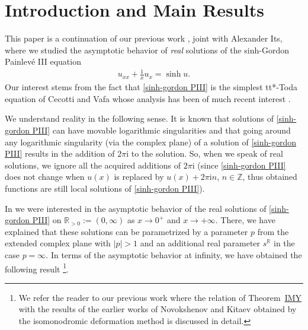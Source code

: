 \documentclass[a4paper,10pt,leqno]{amsart}
\numberwithin{equation}{subsection}
\theoremstyle{plain}
\theoremstyle{definition}
\theoremstyle{remark}
\theoremstyle{case}
\newcommand{\R}{\mathbb R}
\newcommand{\Z}{\mathbb Z}
\newcommand{\ii}{\mathrm{i}}
\begin{document}
\section{Introduction and Main Results}


This paper is a continuation of our previous work \cite{IMY}, joint with Alexander Its, where we studied the asymptotic behavior of {\it real} solutions of the sinh-Gordon Painlev\'e III equation
\begin{align}
    u_{xx} + \frac{1}{x} u_x = \sinh u.
    \label{sinh-gordon PIII}
\end{align}
Our interest stems from the fact that \eqref{sinh-gordon PIII} is the simplest tt*-Toda equation of Cecotti and Vafa \cite{CV1, CV2, CV3} whose analysis has been of much recent interest \cite{GuLi12, GuLi14, GIL1, GIL2, GIL3, GIL4, mcintosh2024}.

We understand reality in the following sense. It is known that solutions of \eqref{sinh-gordon PIII}  can have movable logarithmic singularities and that going around any logarithmic singularity (via the complex plane) of a solution of \eqref{sinh-gordon PIII} results in the addition of \( 2 \pi \ii \) to the solution. So, when we speak of real solutions, we ignore all the acquired additions of \( 2\pi \ii\) (since \eqref{sinh-gordon PIII} does not change when \( u(x) \) is replaced by \( u(x) + 2\pi \ii n \), \( n\in \Z \), thus obtained functions are still local solutions of \eqref{sinh-gordon PIII}).

In \cite{IMY} we were interested in the asymptotic behavior of the real solutions of \eqref{sinh-gordon PIII} on \( \R_{>0}:=(0,\infty) \) as \( x\to 0^+\) and \( x\to+\infty\). There, we have explained that these solutions can be parametrized by a parameter \( p \) from the extended complex plane with \( |p|>1\) and an additional real parameter \( s^\R \) in the case \(p=\infty\). In terms of the asymptotic behavior at infinity, we have obtained the following result \cite[Theorem~2.1]{IMY}\footnote{We refer the reader to our previous work \cite{IMY} where the relation of Theorem~\hyperref[IMY main thm]{IMY} with the results of the earlier works of Novokshenov \cite{Novok4} and Kitaev \cite{Kitaev2} obtained by the isomonodromic deformation method is discussed in detail.}.
\end{document}
